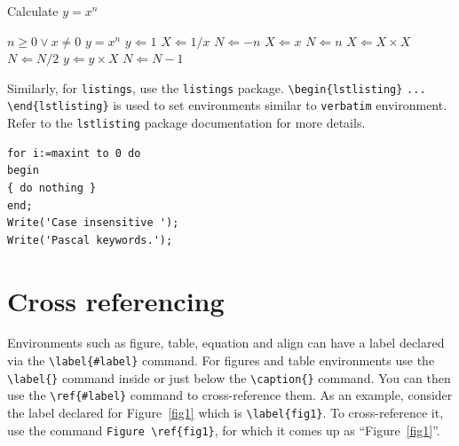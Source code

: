 \documentclass[sn-standardnature]{sn-jnl}%
\theoremstyle{thmstyleone}%
\theoremstyle{thmstyletwo}%
\theoremstyle{thmstylethree}%
\begin{document}
\begin{algorithm}
\caption{Calculate $y = x^n$}\label{algo1}
\begin{algorithmic}[1]
\Require $n \geq 0 \vee x \neq 0$
\Ensure $y = x^n$ 
\State $y \Leftarrow 1$
\label{algln2}
        \State $X \Leftarrow 1 / x$
        \State $N \Leftarrow -n$
\Else
        \State $X \Leftarrow x$
        \State $N \Leftarrow n$
\EndIf
{}
            \State $X \Leftarrow X \times X$
            \State $N \Leftarrow N / 2$
        \Else[$N$ is odd]
            \State $y \Leftarrow y \times X$
            \State $N \Leftarrow N - 1$
        \EndIf
\EndWhile
\end{algorithmic}
\end{algorithm}
\bigskip

Similarly, for \verb+listings+, use the \verb+listings+ package. \verb+\begin{lstlisting}+ \verb+...+ \verb+\end{lstlisting}+ is used to set environments similar to \verb+verbatim+ environment. Refer to the \verb+lstlisting+ package documentation for more details.

\bigskip
\begin{minipage}{\hsize}%
\lstset{frame=single,framexleftmargin=-1pt,framexrightmargin=-17pt,framesep=12pt,linewidth=0.98\textwidth,language=pascal}%
\begin{lstlisting}
for i:=maxint to 0 do
begin
{ do nothing }
end;
Write('Case insensitive ');
Write('Pascal keywords.');
\end{lstlisting}
\end{minipage}

\section{Cross referencing}\label{sec8}

Environments such as figure, table, equation and align can have a label
declared via the \verb+\label{#label}+ command. For figures and table
environments use the \verb+\label{}+ command inside or just
below the \verb+\caption{}+ command. You can then use the
\verb+\ref{#label}+ command to cross-reference them. As an example, consider
the label declared for Figure~\ref{fig1} which is
\verb+\label{fig1}+. To cross-reference it, use the command 
\verb+Figure \ref{fig1}+, for which it comes up as
``Figure~\ref{fig1}''. 
\end{document}
